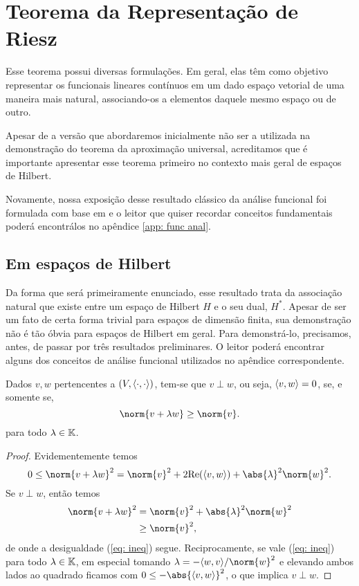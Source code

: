 \section{Teorema da Representação de Riesz}

Esse teorema possui diversas formulações.
Em geral, elas têm como objetivo representar os funcionais lineares contínuos em um dado espaço vetorial de uma maneira mais natural, associando-os a elementos daquele mesmo espaço ou de outro.

Apesar de a versão que abordaremos inicialmente não ser a utilizada na demonstração do teorema da aproximação universal, acreditamos que é importante apresentar esse teorema primeiro no contexto mais geral de espaços de Hilbert.

Novamente, nossa exposição desse resultado clássico da análise funcional foi formulada com base em \cite{func-anal} e o leitor que quiser recordar conceitos fundamentais poderá encontrálos no apêndice \ref{app: func anal}.

\subsection{Em espaços de Hilbert}

Da forma que será primeiramente enunciado, esse resultado trata da associação natural que existe entre um espaço de Hilbert \( H \) e o seu dual, \( H^{ * } \). Apesar de ser um fato de certa forma trivial para espaços de dimensão finita, sua demonstração não é tão óbvia para espaços de Hilbert em geral.
Para demonstrá-lo, precisamos, antes, de passar por três resultados preliminares.
O leitor poderá encontrar alguns dos conceitos de análise funcional utilizados no apêndice correspondente.

\begin{lem}
    Dados \( v, w \) pertencentes a \( (V, \langle\cdot,\cdot\rangle) \), tem-se que \( v \perp w \), ou seja, \( \langle v,w\rangle = 0 \), se, e somente se,
    \begin{equation}
        \norm{ v + \lambda w } \geq \norm{ v }
        \label{eq: ineq}
    .\end{equation}
    para todo \( \lambda \in \mathbb{K} \).
    \label{lem: perp_equiv}
\end{lem}
\begin{proof}
    Evidementemente temos \[
        0
        \leq \norm{ v + \lambda w }^2
        = \norm{ v }^2 + 2 \Re (\dotprod{v,w}) + \abs{ \lambda }^2 \norm{ w }^2
    .\]
    Se \( v \perp w \), então temos
    \begin{align*}
        \norm{ v + \lambda w }^2
        &= \norm{ v }^2 + \abs{ \lambda }^2 \norm{ w }^2 \\
        &\geq \norm{ v }^2
    ,\end{align*}
    de onde a desigualdade (\ref{eq: ineq}) segue.
    Reciprocamente, se vale (\ref{eq: ineq}) para todo \( \lambda \in \mathbb{K} \), em especial tomando \( \lambda = -\dotprod{w,v}/ \norm{ w }^2 \) e elevando ambos lados ao quadrado ficamos com \( 0 \leq - \abs{ \dotprod{v,w} }^2 \), o que implica \( v \perp w \).
\end{proof}

